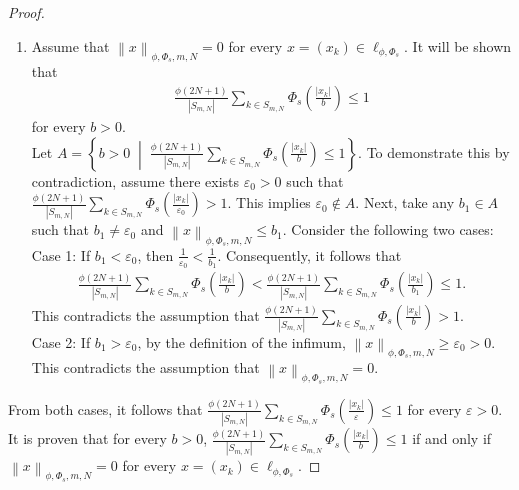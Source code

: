 \documentclass[12pt,a4paper]{article}
\theoremstyle{remark}
\begin{document}
\begin{proof}
\begin{enumerate}
        \item[($\Rightarrow$)] Assume that $\left\lVert x \right\rVert_{\phi, \Phi_s, m, N} = 0$ for every $x = \left(x_k\right) \in \ell_{\phi, \Phi_s}$. It will be shown that 
        \begin{eqnarray*}
            \frac{\phi(2N+1)}{\left|S_{m,N}\right|} \sum_{k \in S_{m,N}} \Phi_s\left(\frac{\left|x_k\right|}{b}\right) \leq 1
        \end{eqnarray*}
        for every $b > 0$.\\
        Let $A = \left\{b > 0 \;\middle|\; \frac{\phi(2N+1)}{\left|S_{m,N}\right|} \sum_{k \in S_{m,N}} \Phi_s\left(\frac{\left|x_k\right|}{b}\right) \leq 1\right\}.$ To demonstrate this by contradiction, assume there exists $\varepsilon_0 > 0$ such that $\frac{\phi(2N+1)}{\left|S_{m,N}\right|} \sum_{k \in S_{m,N}} \Phi_s\left(\frac{\left|x_k\right|}{\varepsilon_0}\right) > 1.$ This implies $\varepsilon_0 \notin A$. Next, take any $b_1 \in A$ such that $b_1 \neq \varepsilon_0$ and $\left\lVert x \right\rVert_{\phi, \Phi_s, m, N} \leq b_1$. Consider the following two cases:\\
        Case 1: If $b_1 < \varepsilon_0$, then $\frac{1}{\varepsilon_0} < \frac{1}{b_1}$. Consequently, it follows that
        \begin{eqnarray*}
            \frac{\phi(2N+1)}{\left|S_{m,N}\right|} \sum_{k \in S_{m,N}} \Phi_s\left(\frac{\left|x_k\right|}{b}\right) < \frac{\phi(2N+1)}{\left|S_{m,N}\right|} \sum_{k \in S_{m,N}} \Phi_s\left(\frac{\left|x_k\right|}{b_1}\right) \leq 1.
        \end{eqnarray*}
        This contradicts the assumption that $\frac{\phi(2N+1)}{\left|S_{m,N}\right|} \sum_{k \in S_{m,N}} \Phi_s\left(\frac{\left|x_k\right|}{b}\right) > 1.$\\
        
        Case 2: If $b_1 > \varepsilon_0$, by the definition of the infimum, $\left\lVert x \right\rVert_{\phi, \Phi_s, m, N} \geq \varepsilon_0 > 0$. This contradicts the assumption that $\left\lVert x \right\rVert_{\phi, \Phi_s, m, N} = 0$.
    \end{enumerate}
    From both cases, it follows that $\frac{\phi(2N+1)}{\left|S_{m,N}\right|} \sum_{k \in S_{m,N}} \Phi_s\left(\frac{\left|x_k\right|}{\varepsilon}\right) \leq 1$ for every $\varepsilon > 0$.
    It is proven that for every $b > 0$, $ \frac{\phi(2N+1)}{\left|S_{m,N}\right|} \sum_{k \in S_{m,N}} \Phi_s\left(\frac{\left|x_k\right|}{b}\right) \leq 1$ if and only if $\left\lVert x \right\rVert_{\phi, \Phi_s, m, N} = 0$ for every $x = \left(x_k\right) \in \ell_{\phi, \Phi_s}$.
\end{proof}
\end{document}
